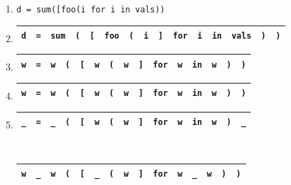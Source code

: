 \documentclass[sigplan,review,anonymous,acmsmall]{acmart}\settopmatter{printfolios=false,printccs=false,printacmref=false}
\begin{document}
\begin{enumerate}
  \item \texttt{d = sum([foo(i\err{]} for i in vals))}
  \item \begin{tabular}{|c|c|c|c|c|c|c|c|c|c|c|c|c|c|c|}
          \hline
          \texttt{d} & \texttt{=} & \texttt{sum} & \texttt{(} & \texttt{[} & \texttt{foo} & \texttt{(} & \texttt{i} & \texttt{]} & \texttt{for} & \texttt{i} & \texttt{in} & \texttt{vals} & \texttt{)} & \texttt{)} \\\hline
  \end{tabular}
  \item \begin{tabular}{|c|c|c|c|c|c|c|c|c|c|c|c|c|c|c|}
          \hline
          \texttt{w} & \texttt{=} & \texttt{w} & \texttt{(} & \texttt{[} & \texttt{w} & \texttt{(} & \texttt{w} & \texttt{]} & \texttt{for} & \texttt{w} & \texttt{in} & \texttt{w} & \texttt{)} & \texttt{)} \\\hline
  \end{tabular}
  \item \begin{tabular}{|||c|||c|||c|||c|||c|||c|||c|||c|||c|||c|||c|||c|||c|||c|||c|||}
          \hline
          \texttt{w} & \texttt{=} & \texttt{w} & \texttt{(} & \texttt{[} & \texttt{w} & \texttt{(} & \texttt{w} & \texttt{]} & \texttt{for} & \texttt{w} & \texttt{in} & \texttt{w} & \texttt{)} & \texttt{)} \\\hline
  \end{tabular}
  \item \begin{tabular}{|||c|||c|||c|||c|||c|||c|||c|||c|||c|||c|||c|||c|||c|||c|||c|||}
          \hline
          \cellcolor{black!15}\texttt{\_} & \texttt{=} & \cellcolor{black!15}\texttt{\_} & \texttt{(} & \texttt{[} & \texttt{w} & \texttt{(} & \texttt{w} & \texttt{]} & \texttt{for} & \texttt{w} & \texttt{in} & \texttt{w} & \texttt{)} & \cellcolor{black!15}\texttt{\_} \\\hline
  \end{tabular}\\
  \begin{tabular}{|||c|||c|||c|||c|||c|||c|||c|||c|||c|||c|||c|||c|||c|||c|||c|||}
    \hline
    \texttt{w} & \cellcolor{black!15}\texttt{\_} & \texttt{w} & \texttt{(} & \texttt{[} & \cellcolor{black!15}\texttt{\_} & \texttt{(} & \texttt{w} & \texttt{]} & \texttt{for} & \texttt{w} & \cellcolor{black!15}\texttt{\_} & \texttt{w} & \texttt{)} & \texttt{)} \\\hline

\end{tabular}
\end{enumerate}
\end{document}
